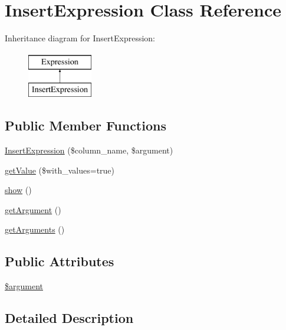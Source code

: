 \hypertarget{classInsertExpression}{}\section{Insert\+Expression Class Reference}
\label{classInsertExpression}
Inheritance diagram for Insert\+Expression\+:\begin{figure}[H]
\begin{center}
\leavevmode
\includegraphics[height=2.000000cm]{classInsertExpression}
\end{center}
\end{figure}
\subsection*{Public Member Functions}
\begin{DoxyCompactItemize}
\item 
\hyperlink{classInsertExpression_af74e1c580c2f1691cdd1bc22c221bc8f}{Insert\+Expression} (\$column\+\_\+name, \$argument)
\item 
\hyperlink{classInsertExpression_ad9d21fa7983a8d93730c6d16b24a0c32}{get\+Value} (\$with\+\_\+values=true)
\item 
\hyperlink{classInsertExpression_a31b4e3976aeb6d73a8f8dba3cd055c29}{show} ()
\item 
\hyperlink{classInsertExpression_aa0f93cc5194b4605d63f96b53f3d037d}{get\+Argument} ()
\item 
\hyperlink{classInsertExpression_aa18be08ea777a25c8f06505d8710ced2}{get\+Arguments} ()
\end{DoxyCompactItemize}
\subsection*{Public Attributes}
\begin{DoxyCompactItemize}
\item 
\hyperlink{classInsertExpression_a0a8efa361a069392a3cca64a675023e0}{\$argument}
\end{DoxyCompactItemize}


\subsection{Detailed Description}


